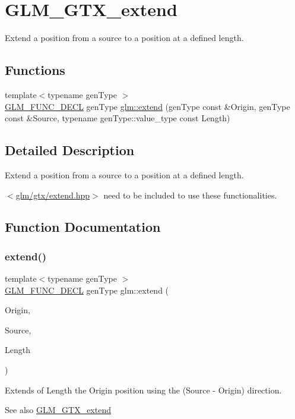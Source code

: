 \hypertarget{group__gtx__extend}{}\section{G\+L\+M\+\_\+\+G\+T\+X\+\_\+extend}
\label{group__gtx__extend}


Extend a position from a source to a position at a defined length.  


\subsection*{Functions}
\begin{DoxyCompactItemize}
\item 
{\footnotesize template$<$typename gen\+Type $>$ }\\\mbox{\hyperlink{setup_8hpp_ab2d052de21a70539923e9bcbf6e83a51}{G\+L\+M\+\_\+\+F\+U\+N\+C\+\_\+\+D\+E\+CL}} gen\+Type \mbox{\hyperlink{group__gtx__extend_ga8140caae613b0f847ab0d7175dc03a37}{glm\+::extend}} (gen\+Type const \&Origin, gen\+Type const \&Source, typename gen\+Type\+::value\+\_\+type const Length)
\end{DoxyCompactItemize}


\subsection{Detailed Description}
Extend a position from a source to a position at a defined length. 

$<$\mbox{\hyperlink{extend_8hpp}{glm/gtx/extend.\+hpp}}$>$ need to be included to use these functionalities. 

\subsection{Function Documentation}
\mbox{\label{group__gtx__extend_ga8140caae613b0f847ab0d7175dc03a37}} 
\subsubsection{\texorpdfstring{extend()}{extend()}}
{\footnotesize\ttfamily template$<$typename gen\+Type $>$ \\
\mbox{\hyperlink{setup_8hpp_ab2d052de21a70539923e9bcbf6e83a51}{G\+L\+M\+\_\+\+F\+U\+N\+C\+\_\+\+D\+E\+CL}} gen\+Type glm\+::extend (\begin{DoxyParamCaption}\item[{gen\+Type const \&}]{Origin,  }\item[{gen\+Type const \&}]{Source,  }\item[{typename gen\+Type\+::value\+\_\+type const}]{Length }\end{DoxyParamCaption})}

Extends of Length the Origin position using the (Source -\/ Origin) direction. \begin{DoxySeeAlso}{See also}
\mbox{\hyperlink{group__gtx__extend}{G\+L\+M\+\_\+\+G\+T\+X\+\_\+extend}} 
\end{DoxySeeAlso}
